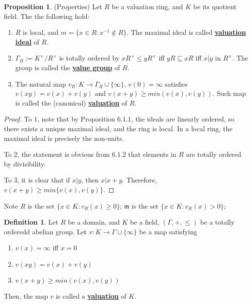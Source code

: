 \documentclass{article}
\theoremstyle{definition}
\theoremstyle{definition}
\theoremstyle{definition}
\newtheorem{proposition}{Proposition}[section]
\theoremstyle{definition}
\theoremstyle{definition}
\newtheorem{definition}{Definition}[section]
\theoremstyle{definition}
\theoremstyle{definition}
\begin{document}
\begin{tcolorbox}[colback=blue!5!white,colframe=blue!30!white]
\begin{proposition}
(Properties) Let $R$ be a valuation ring, and $K$ be its quotient field. The the following hold:
\begin{enumerate}
    \item $R$ is local, and $m=\{x\in R: x^{-1}\not \in R\}$. The maximal ideal is called \underline{\textbf{valuation ideal}} of $R$.
    \item $\Gamma_R:=K^{\times}/R^{\times}$ is totally ordered by $xR^{\times}\leq yR^{\times}$ iff $yR\subseteq xR$ iff $x|y$ in $R^{\times}$. The group is called the \underline{\textbf{value group}} of $R$.
    \item The natural map $v_R: K\to \Gamma_R\cup \{\infty\}$, $v(0)=\infty$ satisfies $v(xy)=v(x)+v(y)$ and $v(x+y)\geq min(v(x),v(y))$. Such map is called the (canonical) \underline{\textbf{valuation}} of $R$.
\end{enumerate}
\end{proposition}
\end{tcolorbox}
\begin{proof}
    To $1$, note that by Proposition $6.1.1$, the ideals are linearly ordered, so there exists a unique maximal ideal, and the ring is local. In a local ring, the maximal ideal is precisely the non-units. 

    To $2$, the statement is obvious from $6.1.2$ that elements in $R$ are totally ordered by divisibility.

    To $3$, it is clear that if $x|y$, then $x|x+y$. Therefore, $v(x+y)\geq min\{v(x),v(y)\}$. 
\end{proof}
Note $R$ is the set $\{ x\in K:v_R(x)\geq 0 \}$; $\mathfrak{m}$ is the set $\{ x\in K:v_R(x)> 0 \}$;



\begin{tcolorbox}[colback=purple!5!white,colframe=purple!75!black]
\begin{definition}
    Let $R$ be a domain, and $K$ be a field, $(\Gamma,+,\leq )$ be a totally orderedd abelian group. Let $v: K\to \Gamma\cup \{\infty\}$ be a map satisfying 
    \begin{enumerate}
        \item $v(x)=\infty$ iff $x=0$
        \item $v(xy)=v(x)+v(y)$
        \item $v(x+y)\geq min(v(x),v(y))$
    \end{enumerate}
    Then, the map $v$ is called a \underline{\textbf{valuation}} of $K$.
\end{definition}
\end{tcolorbox}
\end{document}

